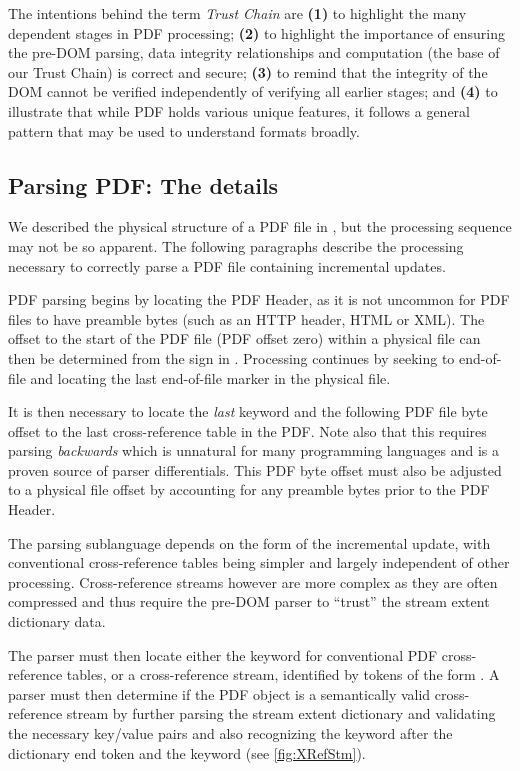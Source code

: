 

The intentions behind the term \emph{Trust Chain} are
%
\textbf{(1)} to highlight the many dependent stages in PDF processing;
%
\textbf{(2)} to highlight the importance of ensuring the pre-DOM
parsing, data integrity relationships and computation (the base of our
Trust Chain) is correct and secure;
%
\textbf{(3)} to remind that the integrity of the DOM cannot be
verified independently of verifying all earlier stages; and
%
\textbf{(4)} to illustrate that while PDF holds various unique
features, it follows a general pattern that may be used to understand
formats broadly.


\subsection{Parsing PDF: The details}
\label{sec:parsingfile}

We described the physical structure of a PDF file in ,
but the processing sequence may not be so apparent.
The following paragraphs describe the processing necessary to correctly parse a PDF file containing incremental updates.

PDF parsing begins by locating the PDF Header, as it is not uncommon for PDF files to have 
preamble bytes (such as an HTTP header, HTML or XML). The offset to the start of the PDF file 
(PDF offset zero)
within a physical file can then be determined from the \lstcd{\%} sign in . 
Processing continues by seeking to end-of-file and locating the last end-of-file marker  in the physical file.

It is then necessary to locate the \emph{last}  keyword and the following PDF file byte offset 
to the last cross-reference table in the PDF. Note also that this requires parsing \emph{backwards}
which is unnatural for many programming languages and is a proven source of parser differentials. 
This PDF byte offset must also be adjusted to a physical file offset by accounting for any preamble bytes prior to the PDF Header.

The parsing sublanguage depends on the form of the incremental update, with
conventional cross-reference tables being simpler and largely independent of
other processing. Cross-reference streams however are more complex as they are
often compressed and thus require the pre-DOM parser to ``trust'' the stream
extent dictionary data.

The parser must then locate either the  keyword for
conventional PDF cross-reference tables, or a cross-reference stream, identified by tokens of the form  . 
A parser must then determine if the PDF object is a
semantically valid cross-reference stream by further parsing the stream extent dictionary and 
validating the necessary key/value pairs and also recognizing the  keyword after the dictionary end token \lstcd{>>} and the  keyword (see \cref{fig:XRefStm}). 

